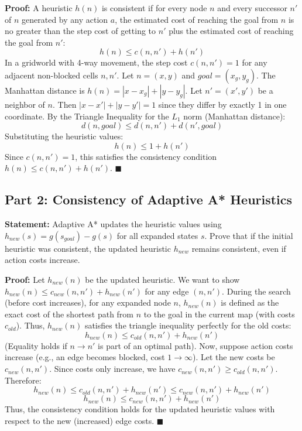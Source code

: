 \documentclass{article}
\begin{document}
\textbf{Proof:}
A heuristic $h(n)$ is consistent if for every node $n$ and every successor $n'$ of $n$ generated by any action $a$, the estimated cost of reaching the goal from $n$ is no greater than the step cost of getting to $n'$ plus the estimated cost of reaching the goal from $n'$:
\[ h(n) \le c(n, n') + h(n') \]
In a gridworld with 4-way movement, the step cost $c(n, n') = 1$ for any adjacent non-blocked cells $n, n'$.
Let $n = (x, y)$ and $goal = (x_g, y_g)$.
The Manhattan distance is $h(n) = |x - x_g| + |y - y_g|$.
Let $n' = (x', y')$ be a neighbor of $n$. Then $|x - x'| + |y - y'| = 1$ since they differ by exactly 1 in one coordinate.
By the Triangle Inequality for the $L_1$ norm (Manhattan distance):
\[ d(n, goal) \le d(n, n') + d(n', goal) \]
Substituting the heuristic values:
\[ h(n) \le 1 + h(n') \]
Since $c(n, n') = 1$, this satisfies the consistency condition $h(n) \le c(n, n') + h(n')$. $\blacksquare$

\subsection*{Part 2: Consistency of Adaptive A* Heuristics}
\textbf{Statement:} Adaptive A* updates the heuristic values using $h_{new}(s) = g(s_{goal}) - g(s)$ for all expanded states $s$. Prove that if the initial heuristic was consistent, the updated heuristic $h_{new}$ remains consistent, even if action costs increase.

\textbf{Proof:}
Let $h_{new}(n)$ be the updated heuristic. We want to show $h_{new}(n) \le c_{new}(n, n') + h_{new}(n')$ for any edge $(n, n')$.
During the search (before cost increases), for any expanded node $n$, $h_{new}(n)$ is defined as the exact cost of the shortest path from $n$ to the goal in the current map (with costs $c_{old}$).
Thus, $h_{new}(n)$ satisfies the triangle inequality perfectly for the old costs:
\[ h_{new}(n) \le c_{old}(n, n') + h_{new}(n') \]
(Equality holds if $n \to n'$ is part of an optimal path).
Now, suppose action costs increase (e.g., an edge becomes blocked, cost $1 \to \infty$).
Let the new costs be $c_{new}(n, n')$. Since costs only increase, we have $c_{new}(n, n') \ge c_{old}(n, n')$.
Therefore:
\[ h_{new}(n) \le c_{old}(n, n') + h_{new}(n') \le c_{new}(n, n') + h_{new}(n') \]
\[ h_{new}(n) \le c_{new}(n, n') + h_{new}(n') \]
Thus, the consistency condition holds for the updated heuristic values with respect to the new (increased) edge costs. $\blacksquare$
\end{document}
